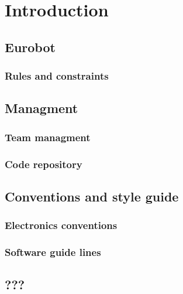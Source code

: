 \chapter{Introduction}



\section{Eurobot}

\subsection{Rules and constraints}

\section{Managment}

\subsection{Team managment}

\subsection{Code repository}

\section{Conventions and style guide}

\subsection{Electronics conventions}

\subsection{Software guide lines}

\section{???}
